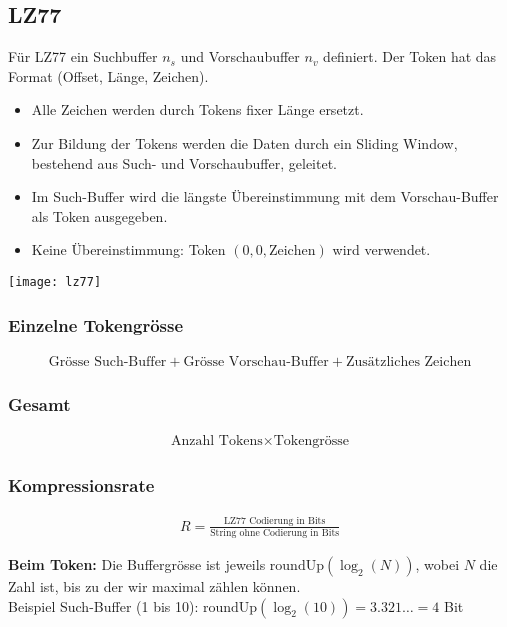 \subsection{LZ77}
Für LZ77 ein Suchbuffer $n_{s}$ und Vorschaubuffer $n_{v}$ definiert.
Der Token hat das Format (Offset, Länge, Zeichen).
\begin{itemize}
    \item Alle Zeichen werden durch Tokens fixer Länge ersetzt.
    \item Zur Bildung der Tokens werden die Daten durch ein Sliding Window, bestehend aus Such- und Vorschaubuffer, geleitet.
    \item Im Such-Buffer wird die längste Übereinstimmung mit dem Vorschau-Buffer als Token ausgegeben.
    \item Keine Übereinstimmung: Token $(0, 0, \text{Zeichen})$ wird verwendet.
\end{itemize}
\begin{center}
	\texttt{[image: lz77]}
\end{center}

\subsubsection{Einzelne Tokengrösse}
\begin{align*}
\text{Grösse Such-Buffer} + \text{Grösse Vorschau-Buffer} + \text{Zusätzliches Zeichen}
\end{align*}

\subsubsection{Gesamt}
\begin{align*}
\text{Anzahl Tokens} \times \text{Tokengrösse}
\end{align*}

\subsubsection{Kompressionsrate}
\begin{align*}
R = \frac{\text{LZ77 Codierung in Bits}}{\text{String ohne Codierung in Bits}}
\end{align*}

\noindent
\textbf{Beim Token:} Die Buffergrösse ist jeweils $\text{roundUp}(\log_2(N))$, wobei $N$ die Zahl ist, bis zu der wir maximal zählen können. \\
Beispiel Such-Buffer (1 bis 10): $\text{roundUp}(\log_2(10)) = 3.321\ldots = 4$ Bit
